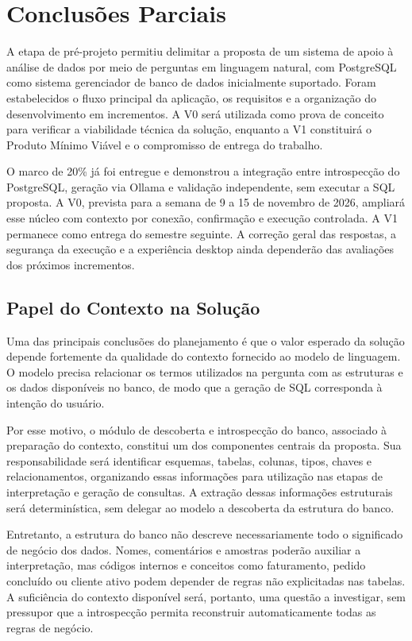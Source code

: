 \chapter{Conclusões Parciais}
\label{cap:04}

A etapa de pré-projeto permitiu delimitar a proposta de um sistema de apoio à análise de dados por meio de perguntas em linguagem natural, com PostgreSQL como sistema gerenciador de banco de dados inicialmente suportado. Foram estabelecidos o fluxo principal da aplicação, os requisitos e a organização do desenvolvimento em incrementos. A V0 será utilizada como prova de conceito para verificar a viabilidade técnica da solução, enquanto a V1 constituirá o Produto Mínimo Viável e o compromisso de entrega do trabalho.

O marco de 20\% já foi entregue e demonstrou a integração entre introspecção do PostgreSQL, geração via Ollama e validação independente, sem executar a SQL proposta. A V0, prevista para a semana de 9 a 15 de novembro de 2026, ampliará esse núcleo com contexto por conexão, confirmação e execução controlada. A V1 permanece como entrega do semestre seguinte. A correção geral das respostas, a segurança da execução e a experiência desktop ainda dependerão das avaliações dos próximos incrementos.

\section{Papel do Contexto na Solução}

Uma das principais conclusões do planejamento é que o valor esperado da solução depende fortemente da qualidade do contexto fornecido ao modelo de linguagem. O modelo precisa relacionar os termos utilizados na pergunta com as estruturas e os dados disponíveis no banco, de modo que a geração de SQL corresponda à intenção do usuário.

Por esse motivo, o módulo de descoberta e introspecção do banco, associado à preparação do contexto, constitui um dos componentes centrais da proposta. Sua responsabilidade será identificar esquemas, tabelas, colunas, tipos, chaves e relacionamentos, organizando essas informações para utilização nas etapas de interpretação e geração de consultas. A extração dessas informações estruturais será determinística, sem delegar ao modelo a descoberta da estrutura do banco.

Entretanto, a estrutura do banco não descreve necessariamente todo o significado de negócio dos dados. Nomes, comentários e amostras poderão auxiliar a interpretação, mas códigos internos e conceitos como faturamento, pedido concluído ou cliente ativo podem depender de regras não explicitadas nas tabelas. A suficiência do contexto disponível será, portanto, uma questão a investigar, sem pressupor que a introspecção permita reconstruir automaticamente todas as regras de negócio.

